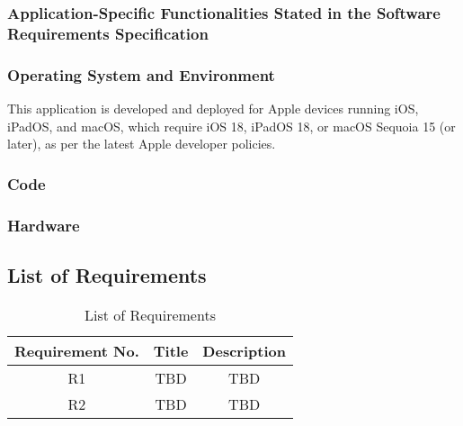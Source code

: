 \documentclass[11pt]{article}
\begin{document}
\subsubsection{Application-Specific Functionalities Stated in the Software Requirements
Specification}

\subsubsection{Operating System and Environment}

This application is developed and deployed for Apple devices running iOS, iPadOS, and macOS, which require iOS 18, iPadOS 18, or macOS Sequoia 15 (or later), as per the latest Apple developer policies.


\subsubsection{Code}

\subsubsection{Hardware}


\subsection{List of Requirements}
\begin{table}[h]
    \centering
    \caption{List of Requirements}
    \begin{tabular}{ccc}
        \toprule
        Requirement No. & Title & Description \\
        \midrule
        R1 & TBD & TBD \\
        R2 & TBD & TBD \\
        \bottomrule
    \end{tabular}
    \label{tab:docs_rev_hist}
\end{table}
\end{document}
